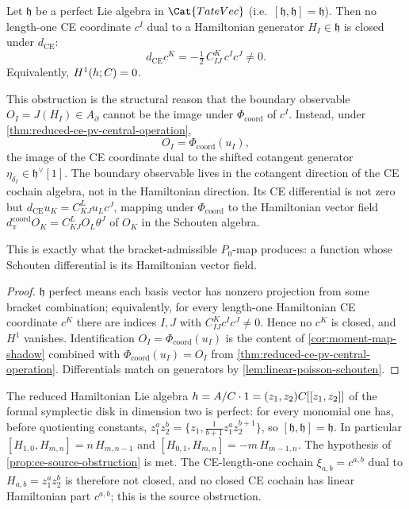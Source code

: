 \documentclass[11pt]{memoir}
\begin{document}
\begin{prop}\label{prop:ce-source-obstruction}
  Let $\mathfrak h$ be a perfect Lie algebra in $\Cat{TateVec}$
  (i.e.\ $[\mathfrak h,\mathfrak h]=\mathfrak h$). Then no length-one CE
  coordinate $c^I$ dual to a Hamiltonian generator $H_I\in\mathfrak h$
  is closed under $d_{\mathrm{CE}}$:
  $$d_{\mathrm{CE}}c^K=-\tfrac12\,C^K_{IJ}\,c^Ic^J\neq 0.$$
  Equivalently, $H^1(h;C)=0$.

  This obstruction is the structural reason that the boundary observable
	  $O_I=J(H_I)\in A_\partial$ cannot be the image under
	  \(\Phi_{\mathrm{coord}}\) of $c^I$.
	  Instead, under \ref{thm:reduced-ce-pv-central-operation},
	  $$O_I=\Phi_{\mathrm{coord}}(u_I),$$
  the image of the CE coordinate dual to the shifted cotangent generator
  $\eta_{\delta_I}\in\mathfrak h^\vee[1]$. The boundary observable lives
  in the cotangent direction of the CE cochain algebra, not in the
  Hamiltonian direction. Its CE differential is not zero but
	  $d_{\mathrm{CE}}u_K=C^L_{KJ}u_Lc^J$, mapping under
	  \(\Phi_{\mathrm{coord}}\) to the
	  Hamiltonian vector field
	  \(d_\pi^{\mathrm{coord}}O_K=C^L_{KJ}O_L\theta^J\) of \(O_K\) in
  the Schouten algebra.

	  This is exactly what the bracket-admissible \(P_0\)-map produces: a
	  function whose Schouten differential is its Hamiltonian vector field.
\end{prop}

\begin{proof}
  $\mathfrak h$ perfect means each basis vector has nonzero projection
  from some bracket combination; equivalently, for every length-one
  Hamiltonian CE coordinate \(c^K\) there are indices \(I,J\) with
  \(C^K_{IJ}c^Ic^J\neq0\). Hence no \(c^K\) is closed, and \(H^1\)
  vanishes.
	  Identification \(O_I=\Phi_{\mathrm{coord}}(u_I)\) is the content of
	  \ref{cor:moment-map-shadow} combined with
	  \(\Phi_{\mathrm{coord}}(u_I)=O_I\) from
  \ref{thm:reduced-ce-pv-central-operation}. Differentials match on
  generators by \ref{lem:linear-poisson-schouten}.
\end{proof}

\begin{rmk}\label{rmk:ce-source-obstruction-disk}
  The reduced Hamiltonian Lie algebra
  $h=A/C\cdot 1=(z_1,z_2)C[[z_1,z_2]]$ of the
  formal symplectic disk in dimension two is perfect: for every
  monomial one has, before quotienting constants,
  $z_1^az_2^b=\bigl\{z_1,\tfrac{1}{b+1}z_1^az_2^{b+1}\bigr\}$, so
  $[\mathfrak h,\mathfrak h]=\mathfrak h$. In particular
  $[H_{1,0},H_{m,n}]=n\,H_{m,n-1}$ and
  $[H_{0,1},H_{m,n}]=-m\,H_{m-1,n}$. The hypothesis of
  \ref{prop:ce-source-obstruction} is met. The CE-length-one cochain
  $\xi_{a,b}=c^{a,b}$ dual to $H_{a,b}=z_1^az_2^b$ is therefore not
  closed, and no closed CE cochain has linear Hamiltonian part
  $c^{a,b}$; this is the source obstruction.
\end{rmk}
\end{document}
